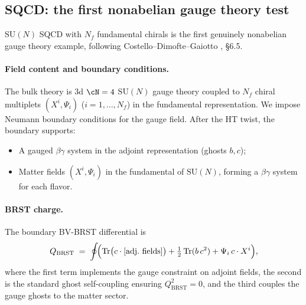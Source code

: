 \subsection{SQCD: the first nonabelian gauge theory test}

\providecommand{\QBRST}{Q_{\mathrm{BRST}}}

$\mathrm{SU}(N)$ SQCD with $N_f$
fundamental chirals is the first genuinely nonabelian gauge theory
example, following Costello--Dimofte--Gaiotto
\cite{CDG2023}, \S6.5.

\paragraph{Field content and boundary conditions.}
The bulk theory is $3$d $\cN=4$ $\mathrm{SU}(N)$ gauge theory coupled to
$N_f$ chiral multiplets $(X^i, \Psi_i)$ ($i = 1, \ldots, N_f$) in the
fundamental representation. We impose Neumann boundary conditions for the
gauge field. After the HT twist, the boundary supports:
\begin{itemize}
\item A gauged $\beta\gamma$ system in the adjoint representation
 (ghosts $b, c$);
\item Matter fields $(X^i, \Psi_i)$ in the fundamental of
 $\mathrm{SU}(N)$, forming a $\beta\gamma$ system for each flavor.
\end{itemize}

\paragraph{BRST charge.}
The boundary BV-BRST differential is
\begin{equation}%
 \QBRST \;=\; \oint\!\Bigl(
 \operatorname{Tr}\bigl(c \cdot [\text{adj.\ fields}]\bigr)
 + \tfrac{1}{2}\operatorname{Tr}(b\, c^2)
 + \Psi_i\, c \cdot X^i
 \Bigr),
\end{equation}
where the first term implements the gauge constraint on adjoint fields,
the second is the standard ghost self-coupling ensuring $\QBRST^2 = 0$,
and the third couples the gauge ghosts to the matter sector.

